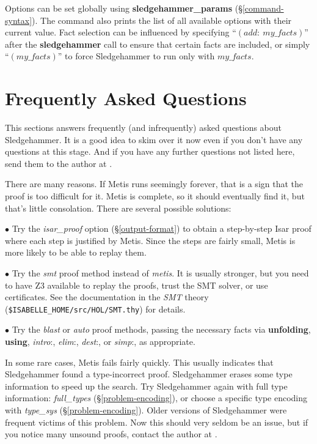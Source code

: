 \documentclass[a4paper,12pt]{article}
\begin{document}
Options can be set globally using \textbf{sledgehammer\_params}
(\S\ref{command-syntax}). The command also prints the list of all available
options with their current value. Fact selection can be influenced by specifying
``$(\textit{add}{:}~\textit{my\_facts})$'' after the \textbf{sledgehammer} call
to ensure that certain facts are included, or simply ``$(\textit{my\_facts})$''
to force Sledgehammer to run only with $\textit{my\_facts}$.

\section{Frequently Asked Questions}
\label{frequently-asked-questions}

This sections answers frequently (and infrequently) asked questions about
Sledgehammer. It is a good idea to skim over it now even if you don't have any
questions at this stage. And if you have any further questions not listed here,
send them to the author at \authoremail.


There are many reasons. If Metis runs seemingly forever, that is a sign that the
proof is too difficult for it. Metis is complete, so it should eventually find
it, but that's little consolation. There are several possible solutions:

\begin{enum}
\item[$\bullet$] Try the \textit{isar\_proof} option (\S\ref{output-format}) to
obtain a step-by-step Isar proof where each step is justified by Metis. Since
the steps are fairly small, Metis is more likely to be able to replay them.

\item[$\bullet$] Try the \textit{smt} proof method instead of \textit{metis}. It
is usually stronger, but you need to have Z3 available to replay the proofs,
trust the SMT solver, or use certificates. See the documentation in the
\emph{SMT} theory (\texttt{\$ISABELLE\_HOME/src/HOL/SMT.thy}) for details.

\item[$\bullet$] Try the \textit{blast} or \textit{auto} proof methods, passing
the necessary facts via \textbf{unfolding}, \textbf{using}, \textit{intro}{:},
\textit{elim}{:}, \textit{dest}{:}, or \textit{simp}{:}, as appropriate.
\end{enum}

In some rare cases, Metis fails fairly quickly. This usually indicates that
Sledgehammer found a type-incorrect proof. Sledgehammer erases some type
information to speed up the search. Try Sledgehammer again with full type
information: \textit{full\_types} (\S\ref{problem-encoding}), or choose a
specific type encoding with \textit{type\_sys} (\S\ref{problem-encoding}). Older
versions of Sledgehammer were frequent victims of this problem. Now this should
very seldom be an issue, but if you notice many unsound proofs, contact the
author at \authoremail.
\end{document}
